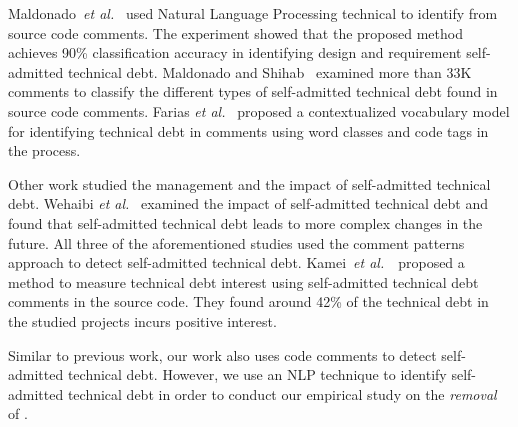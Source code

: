 Maldonado~\textit{et al.}~\cite{Maldonado2015TSE} used Natural Language Processing technical to identify \SATD from source code comments. The experiment showed that the proposed method achieves 90\% classification accuracy in identifying design and requirement self-admitted technical debt.  Maldonado and Shihab~\cite{Maldonado2015MTD} examined more than 33K comments to classify the different types of self-admitted technical debt found in source code comments. Farias \textit{et al.}~\cite{Farias2015MTD} proposed a contextualized vocabulary model for identifying technical debt in comments using word classes and code tags in the process.



Other work studied the management and the impact of self-admitted technical debt. Wehaibi \textit{et al.}~\cite{Wehaibi2016SANER} examined the impact of self-admitted technical debt and found that self-admitted technical debt leads to more complex changes in the future. All three of the aforementioned studies used the comment patterns approach to detect self-admitted technical debt. Kamei~\textit{et al.}~\cite{kameiusingTDA2016}~proposed a method to measure technical debt interest using self-admitted technical debt comments in the source code. They found around 42\% of the technical debt in the studied projects incurs positive interest.


Similar to previous work, our work also uses code comments to detect self-admitted technical debt. However, we use an NLP technique to identify self-admitted technical debt in order to conduct our empirical study on the \emph{removal} of \SATD.











